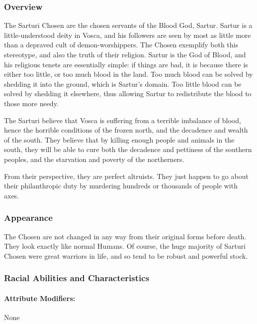 \documentclass[oneside,11pt,english]{book}
\begin{document}
\subsubsection*{Overview} 
The Sarturi Chosen are the chosen servants of the Blood God, Sartur. Sartur is a little-understood deity in 
Vosca, and his followers are seen by most as little more than a depraved cult of demon-worshippers. The 
Chosen exemplify both this stereotype, and also the truth of their religion. Sartur is the God of Blood, and 
his religious tenets are essentially simple: if things are bad, it is because there is either too little, or too 
much blood in the land. Too much blood can be solved by shedding it into the ground, which is Sartur's 
domain. Too little blood can be solved by shedding it elsewhere, thus allowing Sartur to redistribute the 
blood to those more needy. 

The Sarturi believe that Vosca is suffering from a terrible imbalance of blood, 
hence the horrible conditions of the frozen north, and the decadence and wealth of the south. They believe 
that by killing enough people and animals in the south, they will be able to cure both the decadence and 
pettiness of the southern peoples, and the starvation and poverty of the northerners. 


From their perspective, they are perfect altruists. They just happen to go about their philanthropic duty by 
murdering hundreds or thousands of people with axes. 
\subsubsection*{Appearance} 
The Chosen are not changed in any way from their original forms before death. They look exactly like 
normal Humans. Of course, the huge majority of Sarturi Chosen were great warriors in life, and so tend to 
be robust and powerful stock. 
\subsubsection*{Racial Abilities and Characteristics}
\paragraph{Attribute Modifiers:} None 
\end{document}
